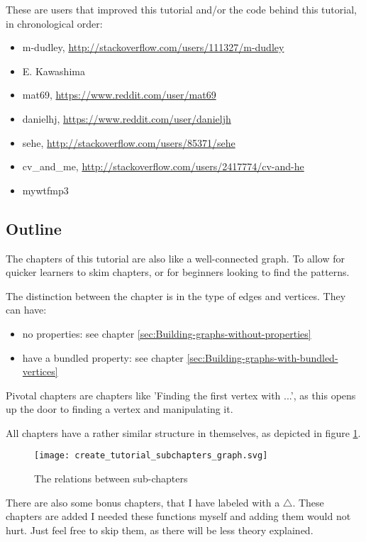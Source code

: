 These are users that improved this tutorial and/or the code behind this
tutorial, in chronological order:

\begin{itemize}
  \item m-dudley, \url{http://stackoverflow.com/users/111327/m-dudley}
  \item E. Kawashima
  \item mat69, \url{https://www.reddit.com/user/mat69}
  \item danielhj, \url{https://www.reddit.com/user/danieljh}
  \item sehe, \url{http://stackoverflow.com/users/85371/sehe}
  \item cv\_and\_me, \url{http://stackoverflow.com/users/2417774/cv-and-he}
  \item mywtfmp3
\end{itemize}

\subsection{Outline}

The chapters of this tutorial are also like a well-connected graph.
To allow for quicker learners to skim chapters, or for beginners looking
to find the patterns.

The distinction between the chapter is in the type of edges and vertices.
They can have:

\begin{itemize}
  \item no properties: 
    see chapter \ref{sec:Building-graphs-without-properties}
  \item have a bundled property: 
    see chapter \ref{sec:Building-graphs-with-bundled-vertices}
\end{itemize}

Pivotal chapters are chapters like 'Finding the first vertex with ...', as
this opens up the door to finding a vertex and manipulating it.

All chapters have a rather similar structure in themselves, as depicted
in figure \ref{fig:The-relations-between-subchapters}.

\begin{figure}[!htbp]
  \texttt{[image: create\_tutorial\_subchapters\_graph.svg]}
  \caption{
    The relations between sub-chapters
  }
  \label{fig:The-relations-between-subchapters}
\end{figure}

There are also some bonus chapters, that I have labeled with a $\triangle$.
These chapters are added I needed these functions myself and adding them
would not hurt.
Just feel free to skip them, as there will be less theory explained.

